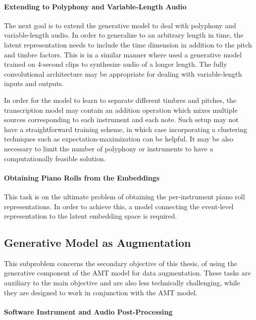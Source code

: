 \paragraph{Extending to Polyphony and Variable-Length Audio}\mbox{}

The next goal is to extend the generative model to deal with polyphony and variable-length audio.
In order to generalize to an arbitrary length in time, the latent representation needs to include the time dimension in addition to the pitch and timbre factors.
This is in a similar manner where  used a generative model trained on 4-second clips to synthesize audio of a longer length.
The fully convolutional architecture \cite{shelhamer2017fcn} may be appropriate for dealing with variable-length inputs and outputs.

In order for the model to learn to separate different timbres and pitches, the transcription model may contain an addition operation which mixes multiple sources corresponding to each instrument and each note.
Such setup may not have a straightforward training scheme, in which case incorporating a clustering techniques such as expectation-maximization can be helpful.
It may be also necessary to limit the number of polyphony or instruments to have a computationally feasible solution.

\paragraph{Obtaining Piano Rolls from the Embeddings}\mbox{}

This task is on the ultimate problem of obtaining the per-instrument piano roll representations.
In order to achieve this, a model connecting the event-level representation to the latent embedding space is required.

\subsection{Generative Model as Augmentation}

This subproblem concerns the secondary objective of this thesis, of using the generative component of the AMT model for data augmentation.
These tasks are auxiliary to the main objective and are also less technically challenging, while they are designed to work in conjunction with the AMT model.

\paragraph{Software Instrument and Audio Post-Processing}\mbox{}

